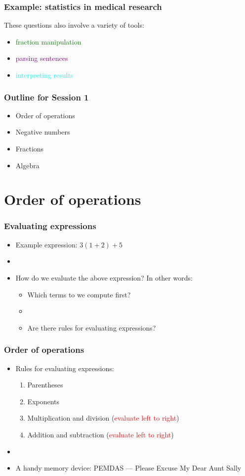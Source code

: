\documentclass[11pt]{beamer}
\newcommand{\myframe}[1]{\begin{frame} \frametitle{#1}}
\newenvironment{spaceitemize}
{ \begin{itemize}
    \setlength{\itemsep}{10pt}
    \setlength{\parskip}{0pt}
    \setlength{\parsep}{0pt}     }
{ \end{itemize}                  }
\begin{document}
\myframe{Example: statistics in medical research}
These questions also involve a variety of tools:
\begin{spaceitemize}
\item \textcolor{green}{fraction manipulation}
\item \textcolor{purple}{parsing sentences}
\item \textcolor{cyan}{interpreting results}
\end{spaceitemize}
\end{frame}

\myframe{Outline for Session 1}
\begin{spaceitemize}
\item Order of operations
\item Negative numbers 
\item Fractions
\item Algebra
\end{spaceitemize}
\end{frame}

\section{Order of operations}
\myframe{Evaluating expressions}\label{ex:oo1}
\begin{itemize}
\item Example expression: $3(1 + 2) + 5$
\item[]
\item How do we evaluate the above expression? In other words:
\begin{itemize}
\item Which terms to we compute first?
\item[]
\item Are there rules for evaluating expressions?
\end{itemize}
\end{itemize}
\end{frame}

\myframe{Order of operations}
\begin{itemize}
\item Rules for evaluating expressions:
\begin{enumerate}
\item Parentheses
\item Exponents
\item Multiplication and division (\textcolor{red}{evaluate left to right})
\item Addition and subtraction (\textcolor{red}{evaluate left to right})
\end{enumerate}
\item[]
\item A handy memory device: PEMDAS --- Please Excuse My Dear Aunt Sally
\end{itemize}
\end{frame}
\end{document}
